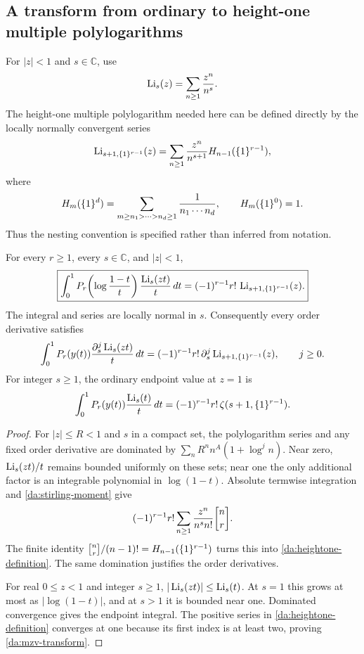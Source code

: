 \subsection{A transform from ordinary to height-one multiple polylogarithms}

For \(|z|<1\) and \(s\in\mathbb C\), use
\[
 \operatorname{Li}_s(z)=\sum_{n\ge1}\frac{z^n}{n^s}.
\]
The height-one multiple polylogarithm needed here can be defined directly
by the locally normally convergent series
\begin{equation}\label{da:heightone-definition}
 \operatorname{Li}_{s+1,\{1\}^{r-1}}(z)
   =\sum_{n\ge1}\frac{z^n}{n^{s+1}}H_{n-1}(\{1\}^{r-1}),
\end{equation}
where
\[
 H_m(\{1\}^{d})=
   \sum_{m\ge n_1>\cdots>n_d\ge1}\frac1{n_1\cdots n_d},
 \qquad H_m(\{1\}^{0})=1.
\]
Thus the nesting convention is specified rather than inferred from
notation.

\begin{theorem}
\label{da:polylog}
For every \(r\ge1\), every \(s\in\mathbb C\), and \(|z|<1\),
\begin{equation}\label{da:polylog-transform}
 \boxed{\displaystyle
 \int_0^1 P_r\!\left(\log\frac{1-t}{t}\right)
                \frac{\operatorname{Li}_s(zt)}t\,d t
   =(-1)^{r-1}r!\,\operatorname{Li}_{s+1,\{1\}^{r-1}}(z).}
\end{equation}
The integral and series are locally normal in \(s\). Consequently every
order derivative satisfies
\begin{equation}\label{da:polylog-order-jets}
 \int_0^1P_r(y(t))\frac{\partial_s^j\operatorname{Li}_s(zt)}t\,d t
  =(-1)^{r-1}r!\,
       \partial_s^j\operatorname{Li}_{s+1,\{1\}^{r-1}}(z),\qquad j\ge0.
\end{equation}
For integer \(s\ge1\), the ordinary endpoint value at \(z=1\) is
\begin{equation}\label{da:mzv-transform}
 \int_0^1P_r(y(t))\frac{\operatorname{Li}_s(t)}t\,d t
   =(-1)^{r-1}r!\,\zeta(s+1,\{1\}^{r-1}).
\end{equation}
\end{theorem}

\begin{proof}
For \(|z|\le R<1\) and \(s\) in a compact set, the polylogarithm
series and any fixed order derivative are dominated by
\(\sum_n R^n n^A(1+\log^j n)\). Near zero,
\(\operatorname{Li}_s(zt)/t\) remains bounded uniformly on these sets; near one
the only additional factor is an integrable polynomial in
\(\log(1-t)\). Absolute termwise integration and
\eqref{da:stirling-moment} give
\[
 (-1)^{r-1}r!\sum_{n\ge1}
       \frac{z^n}{n^s n!}\stir nr.
\]
The finite identity
\(\stir nr/(n-1)!=H_{n-1}(\one{r-1})\) turns this into
\eqref{da:heightone-definition}. The same domination justifies the
order derivatives.

For real \(0\le z<1\) and integer \(s\ge1\),
\(|\operatorname{Li}_s(zt)|\le\operatorname{Li}_s(t)\). At \(s=1\) this grows at most as
\(|\log(1-t)|\), and at \(s>1\) it is bounded near one.
Dominated convergence gives the endpoint integral. The positive series
in \eqref{da:heightone-definition} converges at one because its first
index is at least two, proving \eqref{da:mzv-transform}.
\end{proof}

